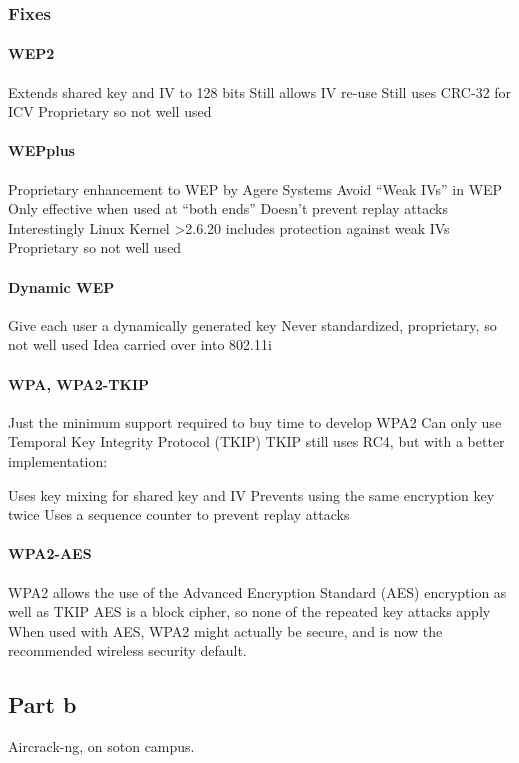 \documentclass[pdftex, 12pt, a4paper]{article}
\begin{document}
\subsubsection{Fixes}

\paragraph{WEP2}
Extends shared key and IV to 128 bits
Still allows IV re-use
Still uses CRC-32 for ICV
Proprietary so not well used
\paragraph{WEPplus}
Proprietary enhancement to WEP by Agere Systems
Avoid ``Weak IVs'' in WEP
Only effective when used at ``both ends''
Doesn't prevent replay attacks
Interestingly Linux Kernel \textgreater 2.6.20 includes protection against weak IVs
Proprietary so not well used
\paragraph{Dynamic WEP}
Give each user a dynamically generated key
Never standardized, proprietary, so not well used
Idea carried over into 802.11i

\paragraph{WPA, WPA2-TKIP}
Just the minimum support required to buy time to develop WPA2
Can only use Temporal Key Integrity Protocol (TKIP)
TKIP still uses RC4, but with a better implementation:

Uses key mixing for shared key and IV
Prevents using the same encryption key twice
Uses a sequence counter to prevent replay attacks

\paragraph{WPA2-AES}
WPA2 allows the use of the Advanced Encryption Standard (AES) encryption as well as TKIP
AES is a block cipher, so none of the repeated key attacks apply
When used with AES, WPA2 might actually be secure, and is now the recommended wireless security default.

\subsection{Part b}
Aircrack-ng, on soton campus.
\end{document}
